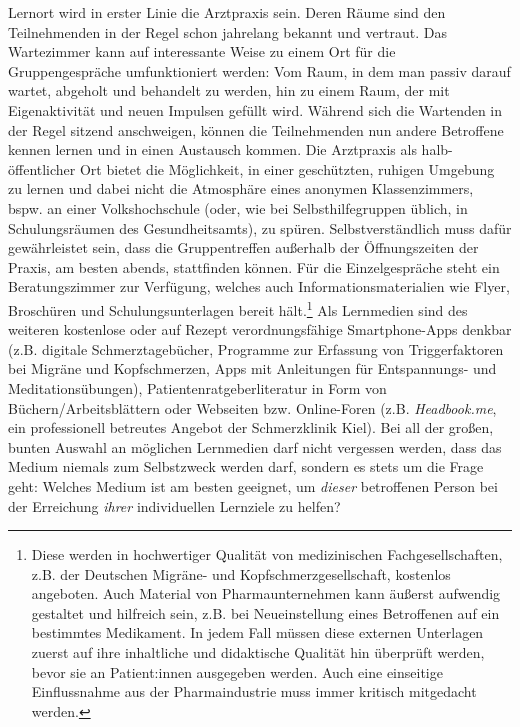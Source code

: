 \documentclass[
  twoside,
  parskip=half-,
]{scrreprt}
\begin{document}
\begin{praxis}
  Lernort wird in erster Linie die Arztpraxis sein. Deren Räume sind den Teilnehmenden in der Regel schon jahrelang bekannt und vertraut. Das Wartezimmer kann auf interessante Weise zu einem Ort für die Gruppengespräche umfunktioniert werden: Vom Raum, in dem man passiv darauf wartet, abgeholt und behandelt zu werden, hin zu einem Raum, der mit Eigenaktivität und neuen Impulsen gefüllt wird. Während sich die Wartenden in der Regel sitzend anschweigen, können die Teilnehmenden nun andere Betroffene kennen lernen und in einen Austausch kommen. Die Arztpraxis als halb-öffentlicher Ort bietet die Möglichkeit, in einer geschützten, ruhigen Umgebung zu lernen und dabei nicht die Atmosphäre eines anonymen Klassenzimmers, bspw. an einer Volkshochschule (oder, wie bei Selbsthilfegruppen üblich, in Schulungsräumen des Gesundheitsamts), zu spüren. Selbstverständlich muss dafür gewährleistet sein, dass die Gruppentreffen außerhalb der Öffnungszeiten der Praxis, am besten abends, stattfinden können. Für die Einzelgespräche steht ein Beratungszimmer zur Verfügung, welches auch Informationsmaterialien wie Flyer, Broschüren und Schulungsunterlagen bereit hält.\footnote{Diese werden in hochwertiger Qualität von medizinischen Fachgesellschaften, z.B. der Deutschen Migräne- und Kopfschmerzgesellschaft, kostenlos angeboten. Auch Material von Pharmaunternehmen kann äußerst aufwendig gestaltet und hilfreich sein, z.B. bei Neueinstellung eines Betroffenen auf ein bestimmtes Medikament. In jedem Fall müssen diese externen Unterlagen zuerst auf ihre inhaltliche und didaktische Qualität hin überprüft werden, bevor sie an Patient:innen ausgegeben werden. Auch eine einseitige Einflussnahme aus der Pharmaindustrie muss immer kritisch mitgedacht werden.} Als Lernmedien sind des weiteren kostenlose oder auf Rezept verordnungsfähige Smartphone-Apps denkbar (z.B. digitale Schmerztagebücher, Programme zur Erfassung von Triggerfaktoren bei Migräne und Kopfschmerzen, Apps mit Anleitungen für Entspannungs- und Meditationsübungen), Patientenratgeberliteratur in Form von Büchern/Arbeitsblättern oder Webseiten bzw. Online-Foren (z.B. \textit{Headbook.me}, ein professionell betreutes Angebot der Schmerzklinik Kiel). Bei all der großen, bunten Auswahl an möglichen Lernmedien darf nicht vergessen werden, dass das Medium niemals zum Selbstzweck werden darf, sondern es stets um die Frage geht: Welches Medium ist am besten geeignet, um \textit{dieser} betroffenen Person bei der Erreichung \textit{ihrer} individuellen Lernziele zu helfen? 
\end{praxis}
\end{document}
